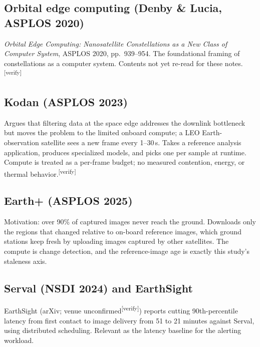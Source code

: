 \documentclass[11pt]{article}
\newcommand{\verify}{\textsuperscript{\textcolor{red!70!black}{[verify]}}}
\begin{document}
\subsection{Orbital edge computing (Denby \& Lucia, ASPLOS 2020)}
\emph{Orbital Edge Computing: Nanosatellite Constellations as a New Class of Computer System}, ASPLOS
2020, pp.\ 939--954. The foundational framing of constellations as a computer system. Contents not yet
re-read for these notes.\verify

\subsection{Kodan (ASPLOS 2023)}
Argues that filtering data at the space edge addresses the downlink bottleneck but moves the problem to
the limited onboard compute; a LEO Earth-observation satellite sees a new frame every 1--30\,s. Takes a
reference analysis application, produces specialized models, and picks one per sample at runtime.
Compute is treated as a per-frame budget; no measured contention, energy, or thermal behavior.\verify

\subsection{Earth+ (ASPLOS 2025)}
Motivation: over 90\% of captured images never reach the ground. Downloads only the regions that changed
relative to on-board reference images, which ground stations keep fresh by uploading images captured by
other satellites. The compute is change detection, and the reference-image age is exactly this study's
staleness axis.

\subsection{Serval (NSDI 2024) and EarthSight}
EarthSight (arXiv; venue unconfirmed\verify) reports cutting 90th-percentile latency from first contact to
image delivery from 51 to 21 minutes against Serval, using distributed scheduling. Relevant as the
latency baseline for the alerting workload.
\end{document}
